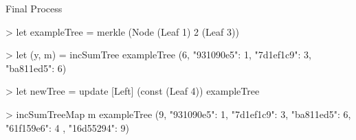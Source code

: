 \begin{slide}{Final Process}
\begin{chaskell}
> let exampleTree = merkle (Node (Leaf 1) 2 (Leaf 3))
 
> let (y, m) = incSumTree exampleTree
    (6, {"931090e5": 1, "7d1ef1c9": 3, "ba811ed5": 6})
  
> let newTree = update [Left] (const (Leaf 4)) exampleTree

> incSumTreeMap m exampleTree
    (9, {"931090e5": 1, "7d1ef1c9": 3, "ba811ed5": 6, "61f159e6": 4
        , "16d55294": 9})
\end{chaskell}
\end{slide}